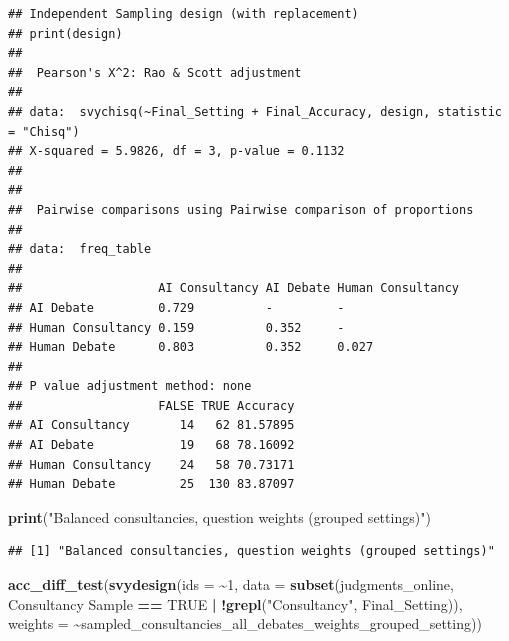 \documentclass[
]{article}
\newenvironment{Shaded}{\begin{snugshade}}{\end{snugshade}}
\newcommand{\AttributeTok}[1]{\textcolor[rgb]{0.13,0.29,0.53}{#1}}
\newcommand{\ConstantTok}[1]{\textcolor[rgb]{0.56,0.35,0.01}{#1}}
\newcommand{\DecValTok}[1]{\textcolor[rgb]{0.00,0.00,0.81}{#1}}
\newcommand{\FunctionTok}[1]{\textcolor[rgb]{0.13,0.29,0.53}{\textbf{#1}}}
\newcommand{\NormalTok}[1]{#1}
\newcommand{\SpecialCharTok}[1]{\textcolor[rgb]{0.81,0.36,0.00}{\textbf{#1}}}
\newcommand{\StringTok}[1]{\textcolor[rgb]{0.31,0.60,0.02}{#1}}
\begin{document}
\begin{verbatim}
## Independent Sampling design (with replacement)
## print(design)
## 
##  Pearson's X^2: Rao & Scott adjustment
## 
## data:  svychisq(~Final_Setting + Final_Accuracy, design, statistic = "Chisq")
## X-squared = 5.9826, df = 3, p-value = 0.1132
## 
## 
##  Pairwise comparisons using Pairwise comparison of proportions 
## 
## data:  freq_table 
## 
##                   AI Consultancy AI Debate Human Consultancy
## AI Debate         0.729          -         -                
## Human Consultancy 0.159          0.352     -                
## Human Debate      0.803          0.352     0.027            
## 
## P value adjustment method: none 
##                   FALSE TRUE Accuracy
## AI Consultancy       14   62 81.57895
## AI Debate            19   68 78.16092
## Human Consultancy    24   58 70.73171
## Human Debate         25  130 83.87097
\end{verbatim}

\begin{Shaded}
\begin{Highlighting}[]
\FunctionTok{print}\NormalTok{(}\StringTok{"Balanced consultancies, question weights (grouped settings)"}\NormalTok{)}
\end{Highlighting}
\end{Shaded}

\begin{verbatim}
## [1] "Balanced consultancies, question weights (grouped settings)"
\end{verbatim}

\begin{Shaded}
\begin{Highlighting}[]
\FunctionTok{acc\_diff\_test}\NormalTok{(}\FunctionTok{svydesign}\NormalTok{(}\AttributeTok{ids =} \SpecialCharTok{\textasciitilde{}}\DecValTok{1}\NormalTok{, }\AttributeTok{data =} \FunctionTok{subset}\NormalTok{(judgments\_online, }\StringTok{\textasciigrave{}}\AttributeTok{Consultancy Sample}\StringTok{\textasciigrave{}} \SpecialCharTok{==} \ConstantTok{TRUE} \SpecialCharTok{|} \SpecialCharTok{!}\FunctionTok{grepl}\NormalTok{(}\StringTok{"Consultancy"}\NormalTok{, Final\_Setting)), }\AttributeTok{weights =} \SpecialCharTok{\textasciitilde{}}\NormalTok{sampled\_consultancies\_all\_debates\_weights\_grouped\_setting))}
\end{Highlighting}
\end{Shaded}
\end{document}
